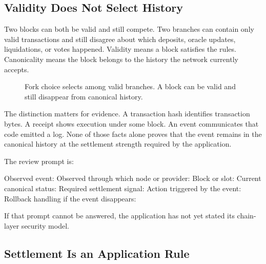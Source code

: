 \subsection{Validity Does Not Select History}

Two blocks can both be valid and still compete. Two branches can contain only valid transactions and still disagree about which deposits, oracle updates, liquidations, or votes happened. Validity means a block satisfies the rules. Canonicality means the block belongs to the history the network currently accepts.

\begin{figure}[htbp]
\centering
{}
\caption{Fork choice selects among valid branches. A block can be valid and still disappear from canonical history.}
\end{figure}

The distinction matters for evidence. A transaction hash identifies transaction bytes. A receipt shows execution under some block. An event communicates that code emitted a log. None of those facts alone proves that the event remains in the canonical history at the settlement strength required by the application.

The review prompt is:

\begin{codeblock}
Observed event:
Observed through which node or provider:
Block or slot:
Current canonical status:
Required settlement signal:
Action triggered by the event:
Rollback handling if the event disappears:
\end{codeblock}

If that prompt cannot be answered, the application has not yet stated its chain-layer security model.

\subsection{Settlement Is an Application Rule}

